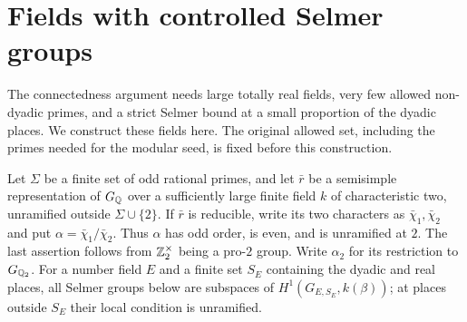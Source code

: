 \section{Fields with controlled Selmer groups}\label{sec:fields}

The connectedness argument needs large totally real fields, very few allowed
non-dyadic primes, and a strict Selmer bound at a small proportion of the
dyadic places.  We construct these fields here.  The original allowed set,
including the primes needed for the modular seed, is fixed before this
construction.

Let $\Sigma$ be a finite set of odd rational primes, and let $\bar r$ be a
semisimple representation of $G_{\mathbb Q}$ over a sufficiently large finite
field $k$ of characteristic two, unramified outside $\Sigma\cup\{2\}$.
If $\bar r$ is reducible, write its two characters as
$\bar\chi_1,\bar\chi_2$ and put $\alpha=\bar\chi_1/\bar\chi_2$.
Thus $\alpha$ has odd order, is even, and is unramified at $2$.
The last assertion follows from
$\mathbb Z_2^\times$ being a pro-$2$ group.  Write $\alpha_2$ for its
restriction to $G_{\mathbb Q_2}$.
For a number field $E$ and a finite set $S_E$ containing the dyadic and
real places, all Selmer groups below are subspaces of
$H^1(G_{E,S_E},k(\beta))$; at places outside $S_E$ their local condition
is unramified.

